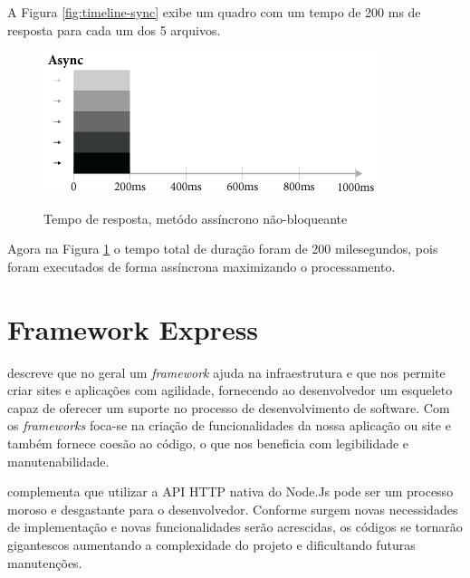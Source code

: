   A Figura \ref{fig:timeline-sync} exibe um quadro com um tempo de 200 ms de resposta para cada um dos 5 arquivos.

  \begin{figure}[H]
  \setlength{\abovecaptionskip}{0pt}
  \setlength{\belowcaptionskip}{0pt}
  \caption[Tempo de resposta, metódo assíncrono não-bloqueante]{Tempo de resposta, metódo assíncrono não-bloqueante}
  \centering
  \includegraphics[width=.85\textwidth]{imagem/timeline-node-async-caio-ribeiro.png}
  \captionsetup{justification=centering}
  \label{fig:timeline-async}
  \end{figure}

  
  Agora na Figura \ref{fig:timeline-async} o tempo total de duração foram de 200 milesegundos, pois foram executados
  de forma assíncrona maximizando o processamento.

\section{Framework Express}
\label{framework-express}

  \cite{Powers:2012} descreve que no geral um \textit{framework} ajuda na infraestrutura e que nos permite criar sites e aplicações
  com agilidade, fornecendo ao desenvolvedor um esqueleto capaz de oferecer um suporte no processo de desenvolvimento de
  software. Com os \textit{frameworks} foca-se na criação de funcionalidades da nossa aplicação ou site e 
  também fornece coesão ao código, o que nos beneficia com legibilidade e manutenabilidade.

  \cite{Pereira:2013} complementa que utilizar a API HTTP nativa do Node.Js pode ser um processo moroso e desgastante
  para o desenvolvedor. 
  Conforme surgem novas necessidades de implementação e novas funcionalidades serão acrescidas,
  os códigos se tornarão gigantescos aumentando a complexidade do projeto e dificultando futuras manutenções.
  
